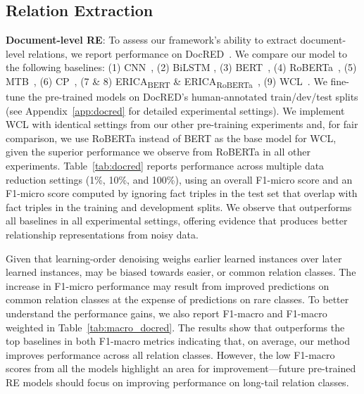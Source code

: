 \subsection{Relation Extraction}\label{subsec:experiments_relation_extraction}

\textbf{Document-level RE}: To assess our framework's ability to extract document-level relations, we report performance on DocRED~\cite{docred}. We compare our model to the following baselines: (1) CNN~\cite{zeng-etal-2014-relation}, (2) BiLSTM \cite{lstm}, (3) BERT~\cite{Devlin2019BERTPO}, (4) RoBERTa~\cite{Liu2019RoBERTaAR}, (5) MTB~\cite{BaldiniSoares2019MatchingTB}, (6) CP~\cite{Peng2020LearningFC}, (7 \& 8) ERICA\textsubscript{BERT} \& ERICA\textsubscript{RoBERTa}~\cite{Qin2021ERICAIE}, (9) WCL~\cite{wcl}.  We fine-tune the pre-trained models on DocRED's human-annotated train/dev/test splits (see Appendix~\ref{app:docred} for detailed experimental settings). We implement WCL with identical settings from our other pre-training experiments and, for fair comparison, we use RoBERTa instead of BERT as the base model for WCL, given the superior performance we observe from RoBERTa in all other experiments. Table~\ref{tab:docred} reports performance across multiple data reduction settings (1\%, 10\%, and 100\%), using an overall F1-micro score and an F1-micro score computed by ignoring fact triples in the test set that overlap with fact triples in the training and development splits. We observe that \our outperforms all baselines in all experimental settings, offering evidence that \our produces better relationship representations from noisy data.

Given that learning-order denoising weighs earlier learned instances over later learned instances, \our may be biased towards easier, or common relation classes. The increase in F1-micro performance may result from improved predictions on common relation classes at the expense of predictions on rare classes. To better understand the performance gains, we also report F1-macro and F1-macro weighted in Table~\ref{tab:macro_docred}. The results show that \our outperforms the top baselines in both F1-macro metrics indicating that, on average, our method improves performance across all relation classes. However, the low F1-macro scores from all the models highlight an area for improvement---future pre-trained RE models should focus on improving performance on long-tail relation classes. 



